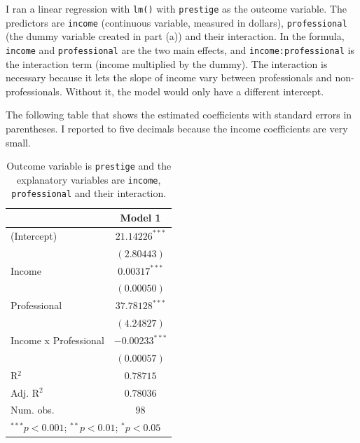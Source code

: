 \documentclass[12pt,letterpaper]{article}
\begin{document}
\begin{enumerate}
		\vspace{.25cm}
		\noindent I ran a linear regression with \texttt{lm()} with \texttt{prestige} as the outcome variable. The predictors are \texttt{income} (continuous variable, measured in dollars), \texttt{professional} (the dummy variable created in part (a)) and their interaction. In the formula, \texttt{income} and \texttt{professional} are the two main effects, and \texttt{income:professional} is the interaction term (income multiplied by the dummy). The interaction is necessary because it lets the slope of income vary between professionals and non-professionals. Without it, the model would only have a different intercept.
		
		
		\vspace{.25cm}
		\noindent The following table that shows the estimated coefficients with standard errors in parentheses. I reported to five decimals because the income coefficients are very small.
		
		\begin{table}[h!]
			\begin{center}
				\caption{\footnotesize{Outcome variable is \texttt{prestige} and the explanatory variables are \texttt{income}, \texttt{professional} and their interaction.}}
				\label{table:model1}
				\begin{tabular}{l c}
					\hline
					& Model 1 \\
					\hline
					(Intercept)           & $21.14226^{***}$ \\
					& $(2.80443)$      \\
					Income                & $0.00317^{***}$  \\
					& $(0.00050)$      \\
					Professional          & $37.78128^{***}$ \\
					& $(4.24827)$      \\
					Income x Professional & $-0.00233^{***}$ \\
					& $(0.00057)$      \\
					\hline
					R$^2$                 & $0.78715$        \\
					Adj. R$^2$            & $0.78036$        \\
					Num. obs.             & $98$             \\
					\hline
					\multicolumn{2}{l}{\scriptsize{$^{***}p<0.001$; $^{**}p<0.01$; $^{*}p<0.05$}}
				\end{tabular}
			\end{center}
		\end{table}
		

\end{enumerate}
\end{document}
